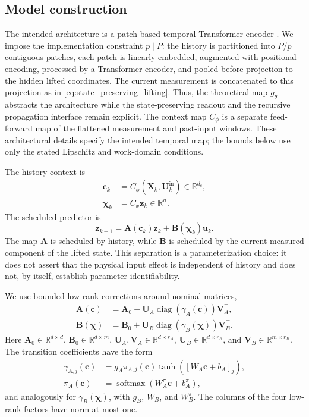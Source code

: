 ﻿\documentclass[journal]{IEEEtran}
\newcommand{\vu}{\mathbf{u}}
\newcommand{\vz}{\mathbf{z}}
\newcommand{\vc}{\mathbf{c}}
\newcommand{\vchi}{\boldsymbol{\chi}}
\newcommand{\mA}{\mathbf{A}}
\newcommand{\mB}{\mathbf{B}}
\newcommand{\mU}{\mathbf{U}}
\newcommand{\mV}{\mathbf{V}}
\newcommand{\mX}{\mathbf{X}}
\newcommand{\R}{\mathbb{R}}
\begin{document}
\subsection{Model construction}

The intended architecture is a patch-based temporal Transformer encoder \cite{vaswani2017attention,nie2023time}. We impose the implementation constraint $p\mid P$: the history is partitioned into $P/p$ contiguous patches, each patch is linearly embedded, augmented with positional encoding, processed by a Transformer encoder, and pooled before projection to the hidden lifted coordinates. The current measurement is concatenated to this projection as in \eqref{eq:state_preserving_lifting}. Thus, the theoretical map $g_\theta$ abstracts the architecture while the state-preserving readout and the recursive propagation interface remain explicit. The context map $C_\phi$ is a separate feed-forward map of the flattened measurement and past-input windows. These architectural details specify the intended temporal map; the bounds below use only the stated Lipschitz and work-domain conditions.

The history context is
\begin{align}
    \vc_k&=C_\phi(\mX_k,\mU_k^{\mathrm{in}})\in\R^{d_c},
    \label{eq:history_context}\\
    \vchi_k&=C_x\vz_k\in\R^n.
    \label{eq:scheduling_variables}
\end{align}
The scheduled predictor is
\begin{equation}
    \vz_{k+1}=\mA(\vc_k)\vz_k+\mB(\vchi_k)\vu_k.
    \label{eq:scheduled_predictor}
\end{equation}
The map $\mA$ is scheduled by history, while $\mB$ is scheduled by the current measured component of the lifted state. This separation is a parameterization choice: it does not assert that the physical input effect is independent of history and does not, by itself, establish parameter identifiability.

We use bounded low-rank corrections around nominal matrices,
\begin{align}
    \mA(\vc)&=\mA_0+\mU_A\operatorname{diag}(\gamma_A(\vc))\mV_A^\top,
    \label{eq:transition_schedule}\\
    \mB(\vchi)&=\mB_0+\mU_B\operatorname{diag}(\gamma_B(\vchi))\mV_B^\top.
    \label{eq:low_rank_schedules}
\end{align}
Here $\mA_0\in\R^{d\times d}$, $\mB_0\in\R^{d\times m}$, $\mU_A,\mV_A\in\R^{d\times r_A}$, $\mU_B\in\R^{d\times r_B}$, and $\mV_B\in\R^{m\times r_B}$. The transition coefficients have the form
\begin{align}
    \gamma_{A,j}(\vc)&=g_A\pi_{A,j}(\vc)\tanh([W_A\vc+b_A]_j),
    \label{eq:A_modulation_coefficients}\\
    \pi_A(\vc)&=\operatorname{softmax}(W_A^\pi\vc+b_A^\pi),
    \label{eq:A_modulation}
\end{align}
and analogously for $\gamma_B(\vchi)$, with $g_B$, $W_B$, and $W_B^\pi$. The columns of the four low-rank factors have norm at most one.
\end{document}
